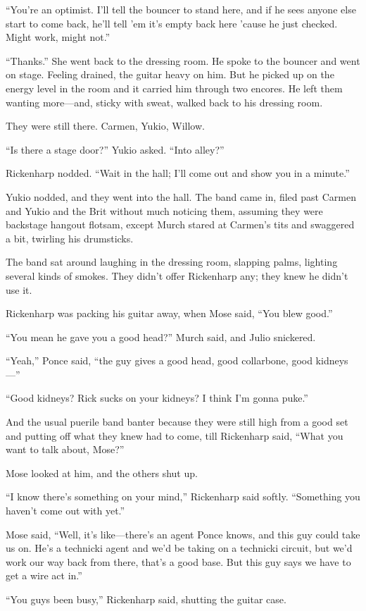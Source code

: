“You’re an optimist. I’ll tell the bouncer to stand here, and if he sees anyone else start to come back, he’ll tell ’em it’s empty back here ’cause he just checked. Might work, might not.”

“Thanks.” She went back to the dressing room. He spoke to the bouncer and went on stage. Feeling drained, the guitar heavy on him. But he picked up on the energy level in the room and it carried him through two encores. He left them wanting more—and, sticky with sweat, walked back to his dressing room.

They were still there. Carmen, Yukio, Willow.

“Is there a stage door?” Yukio asked. “Into alley?”

Rickenharp nodded. “Wait in the hall; I’ll come out and show you in a minute.”

Yukio nodded, and they went into the hall. The band came in, filed past Carmen and Yukio and the Brit without much noticing them, assuming they were backstage hangout flotsam, except Murch stared at Carmen’s tits and swaggered a bit, twirling his drumsticks.

The band sat around laughing in the dressing room, slapping palms, lighting several kinds of smokes. They didn’t offer Rickenharp any; they knew he didn’t use it.

Rickenharp was packing his guitar away, when Mose said, “You blew good.”

“You mean he gave you a good head?” Murch said, and Julio snickered.

“Yeah,” Ponce said, “the guy gives a good head, good collarbone, good kidneys—”

“Good kidneys? Rick sucks on your kidneys? I think I’m gonna puke.”

And the usual puerile band banter because they were still high from a good set and putting off what they knew had to come, till Rickenharp said, “What you want to talk about, Mose?”

Mose looked at him, and the others shut up.

“I know there’s something on your mind,” Rickenharp said softly. “Something you haven’t come out with yet.”

Mose said, “Well, it’s like—there’s an agent Ponce knows, and this guy could take us on. He’s a technicki agent and we’d be taking on a technicki circuit, but we’d work our way back from there, that’s a good base. But this guy says we have to get a wire act in.”

“You guys been busy,” Rickenharp said, shutting the guitar case.


